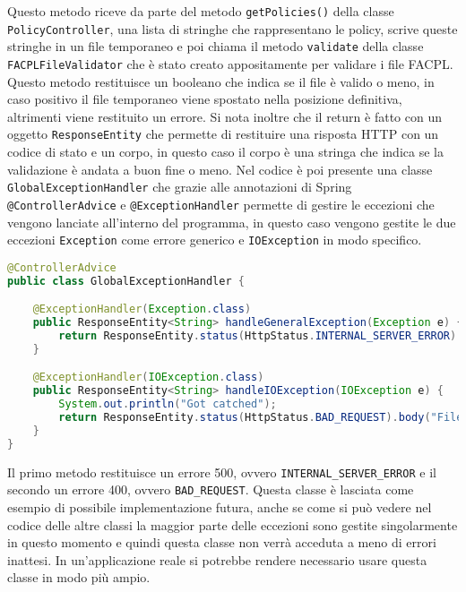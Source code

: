 Questo metodo riceve da parte del metodo \texttt{getPolicies()} della classe \texttt{PolicyController}, una lista di stringhe che rappresentano le policy, scrive queste stringhe in un file temporaneo e poi chiama il metodo \texttt{validate} della classe \texttt{FACPLFileValidator} che è stato creato appositamente per validare i file FACPL. Questo metodo restituisce un booleano che indica se il file è valido o meno, in caso positivo il file temporaneo viene spostato nella posizione definitiva, altrimenti viene restituito un errore. Si nota inoltre che il return è fatto con un oggetto \texttt{ResponseEntity} che permette di restituire una risposta HTTP con un codice di stato e un corpo, in questo caso il corpo è una stringa che indica se la validazione è andata a buon fine o meno.\medbreak
Nel codice è poi presente una classe \texttt{GlobalExceptionHandler} che grazie alle annotazioni di Spring \texttt{@ControllerAdvice} e \texttt{@ExceptionHandler} permette di gestire le eccezioni che vengono lanciate all'interno del programma, in questo caso vengono gestite le due eccezioni \texttt{Exception} come errore generico e \texttt{IOException} in modo specifico.
\begin{lstlisting}[language=Java, caption=GlobalExceptionHandler, label=code:GlobalExceptionHandler, basicstyle=\fontsize{9.5}{11}\ttfamily]
@ControllerAdvice
public class GlobalExceptionHandler {

    @ExceptionHandler(Exception.class)
    public ResponseEntity<String> handleGeneralException(Exception e) {
        return ResponseEntity.status(HttpStatus.INTERNAL_SERVER_ERROR).body("An unexpected error occurred: " + e.getMessage());
    }

    @ExceptionHandler(IOException.class)
    public ResponseEntity<String> handleIOException(IOException e) {
    	System.out.println("Got catched");
        return ResponseEntity.status(HttpStatus.BAD_REQUEST).body("File processing error: " + e.getMessage());
    }
}
\end{lstlisting}
Il primo metodo restituisce un errore 500, ovvero \texttt{INTERNAL\_SERVER\_ERROR} e il secondo un errore 400, ovvero \texttt{BAD\_REQUEST}. Questa classe è lasciata come esempio di possibile implementazione futura, anche se come si può vedere nel codice delle altre classi la maggior parte delle eccezioni sono gestite singolarmente in questo momento e quindi questa classe non verrà acceduta a meno di errori inattesi. In un'applicazione reale si potrebbe rendere necessario usare questa classe in modo più ampio.

